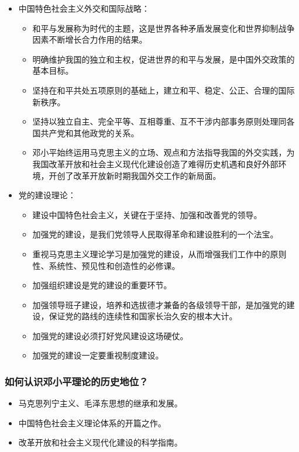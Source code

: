 \documentclass{article}
\begin{document}
\begin{itemize}
    \item 中国特色社会主义外交和国际战略：
    \begin{itemize}
        \item 和平与发展称为时代的主题，这是世界各种矛盾发展变化和世界抑制战争因素不断增长合力作用的结果。
        \item 明确维护我国的独立和主权，促进世界的和平与发展，是中国外交政策的基本目标。
        \item 坚持在和平共处五项原则的基础上，建立和平、稳定、公正、合理的国际新秩序。
        \item 坚持以独立自主、完全平等、互相尊重、互不干涉内部事务原则处理同各国共产党和其他政党的关系。
        \item 邓小平始终运用马克思主义的立场、观点和方法指导我国的外交实践，为我国改革开放和社会主义现代化建设创造了难得历史机遇和良好外部环境，开创了改革开放新时期我国外交工作的新局面。
    \end{itemize}
    \item 党的建设理论：
    \begin{itemize}
        \item 建设中国特色社会主义，关键在于坚持、加强和改善党的领导。
        \item 加强党的建设，是我们党领导人民取得革命和建设胜利的一个法宝。
        \item 重视马克思主义理论学习是加强党的建设，从而增强我们工作中的原则性、系统性、预见性和创造性的必修课。
        \item 加强组织建设是党的建设的重要环节。
        \item 加强领导班子建设，培养和选拔德才兼备的各级领导干部，是加强党的建设，保证党的路线的连续性和国家长治久安的根本大计。
        \item 加强党的建设必须打好党风建设这场硬仗。
        \item 加强党的建设一定要重视制度建设。
    \end{itemize}
\end{itemize}

\subsubsection{如何认识邓小平理论的历史地位？}
\begin{itemize}
    \item 马克思列宁主义、毛泽东思想的继承和发展。
    \item 中国特色社会主义理论体系的开篇之作。
    \item 改革开放和社会主义现代化建设的科学指南。
\end{itemize}
\end{document}
